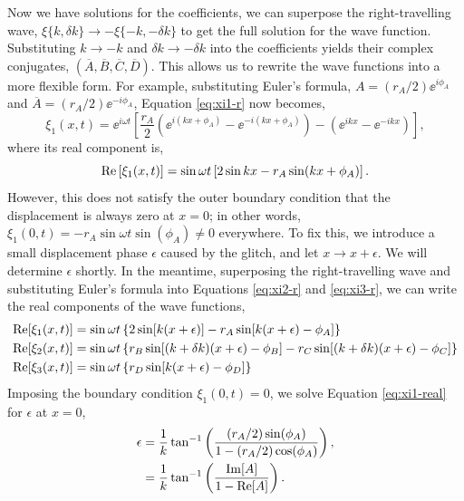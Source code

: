 Now we have solutions for the coefficients, we can superpose the right-travelling wave, \(\xi\{k, \delta k\} \rightarrow - \xi\{-k, -\delta k\}\) to get the full solution for the wave function. Substituting \(k \rightarrow -k\) and \(\delta k \rightarrow -\delta k\) into the coefficients yields their complex conjugates, \((\overline{A},\overline{B},\overline{C},\overline{D})\). This allows us to rewrite the wave functions into a more flexible form. For example, substituting Euler's formula, \(A = (r_A/2) \ee^{i\phi_A}\) and \(\overline{A} = (r_A/2) \ee^{-i\phi_A}\), Equation \ref{eq:xi1-r} now becomes,
%
\begin{equation}
    \xi_1(x, t) = \ee^{i \omega t} \left[ \frac{r_A}{2} \left( \ee^{i(kx + \phi_A)} - \ee^{-i(kx + \phi_A)} \right) - \left( \ee^{ikx} - \ee^{-ikx} \right) \right], \label{eq:xi1}
\end{equation}
%
where its real component is,
\begin{equation}
    {\mathrm{Re}}\left[\xi_1(x, t)\right] = \sin \omega t \left[2 \sin kx - r_A \sin(kx + \phi_A)\right].
\end{equation}
%
However, this does not satisfy the outer boundary condition that the displacement is always zero at \(x=0\); in other words, \(\xi_1(0, t) = - r_A \sin \omega t \sin(\phi_A) \neq 0\) everywhere. To fix this, we introduce a small displacement phase \(\epsilon\) caused by the glitch, and let \(x \rightarrow x + \epsilon\). We will determine \(\epsilon\) shortly. In the meantime, superposing the right-travelling wave and substituting Euler's formula into Equations \ref{eq:xi2-r} and \ref{eq:xi3-r}, we can write the real components of the wave functions,
%
\begin{align}
    {\mathrm{Re}}[\xi_1(x, t)] &= \sin \omega t \left\{2 \sin[k (x + \epsilon)] - r_A \sin[k(x + \epsilon) - \phi_A]\right\} \label{eq:xi1-real} \\
    {\mathrm{Re}}[\xi_2(x, t)] &= \sin \omega t \left\{ r_B \sin[(k + \delta k)(x + \epsilon) - \phi_B] - r_C \sin[(k + \delta k)(x + \epsilon) - \phi_C]\right\} \\
    {\mathrm{Re}}[\xi_3(x, t)] &= \sin \omega t \left\{r_D \sin[k(x + \epsilon) - \phi_D]\right\} \label{eq:xi3-real}
\end{align}
%
Imposing the boundary condition \(\xi_1(0, t) = 0\), we solve Equation \ref{eq:xi1-real} for \(\epsilon\) at \(x=0\),
%
\begin{align}
    \epsilon &= \frac{1}{k} \tan^{-1}\left( \frac{(r_A / 2) \sin(\phi_A)}{1 - (r_A/2) \cos(\phi_A)} \right), \notag\\
    &= \frac{1}{k} \tan^{-1}\left( \frac{{\mathrm{Im}}[A]}{1 - {\mathrm{Re}}[A]} \right). \label{eq:1d-phase}
\end{align}
%

